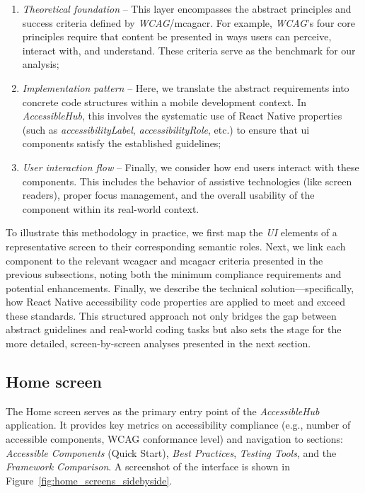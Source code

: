 \begin{enumerate}
    \item \textit{Theoretical foundation} – This layer encompasses the abstract principles and success criteria defined by \textit{WCAG}/\acrshort{mcagacr}. For example, \textit{WCAG}’s four core principles require that content be presented in ways users can perceive, interact with, and understand. These criteria serve as the benchmark for our analysis;

    \item \textit{Implementation pattern} – Here, we translate the abstract requirements into concrete code structures within a mobile development context. In \textit{AccessibleHub}, this involves the systematic use of React Native properties (such as \textit{accessibilityLabel}, \textit{accessibilityRole}, etc.) to ensure that \acrshort{ui} components satisfy the established guidelines;

    \item \textit{User interaction flow} – Finally, we consider how end users interact with these components. This includes the behavior of assistive technologies (like screen readers), proper focus management, and the overall usability of the component within its real-world context.
\end{enumerate}

To illustrate this methodology in practice, we first map the \textit{UI} elements of a representative screen to their corresponding semantic roles. Next, we link each component to the relevant \acrshort{wcagacr} and \acrshort{mcagacr} criteria presented in the previous subsections, noting both the minimum compliance requirements and potential enhancements. Finally, we describe the technical solution—specifically, how React Native accessibility code properties are applied to meet and exceed these standards. This structured approach not only bridges the gap between abstract guidelines and real-world coding tasks but also sets the stage for the more detailed, screen-by-screen analyses presented in the next section.

\subsection{Home screen}

The Home screen serves as the primary entry point of the \textit{AccessibleHub} application. It provides key metrics on accessibility compliance (e.g., number of accessible components, WCAG conformance level) and navigation to sections: \textit{Accessible Components} (Quick Start), \textit{Best Practices}, \textit{Testing Tools}, and the \textit{Framework Comparison}. A screenshot of the interface is shown in Figure~\ref{fig:home_screens_sidebyside}.

